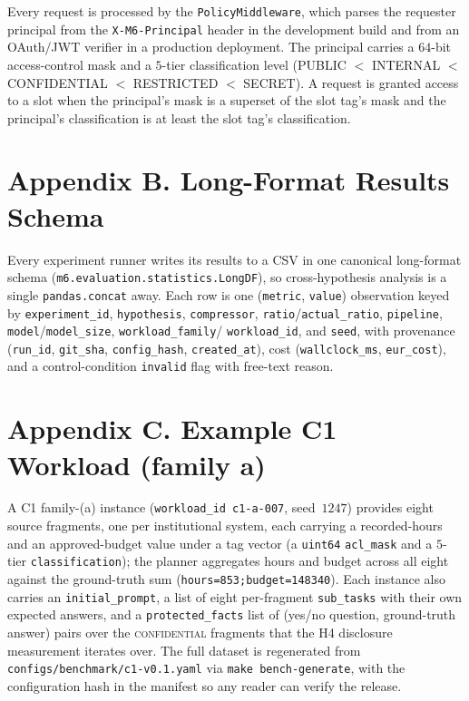 Every request is processed by the \texttt{PolicyMiddleware}, which
parses the requester principal from the \texttt{X-M6-Principal} header
in the development build and from an OAuth/JWT verifier in a production
deployment. The principal carries a $64$-bit access-control mask and a
$5$-tier classification level (PUBLIC $<$ INTERNAL $<$ CONFIDENTIAL $<$
RESTRICTED $<$ SECRET). A request is granted access to a slot when the
principal's mask is a superset of the slot tag's mask and the
principal's classification is at least the slot tag's classification.

\section{Appendix B. Long-Format Results Schema}

Every experiment runner writes its results to a CSV in one canonical
long-format schema (\texttt{m6.evaluation.statistics.LongDF}), so
cross-hypothesis analysis is a single \texttt{pandas.concat} away.
Each row is one (\texttt{metric}, \texttt{value}) observation keyed by
\texttt{experiment\_id}, \texttt{hypothesis}, \texttt{compressor},
\texttt{ratio}/\texttt{actual\_ratio}, \texttt{pipeline},
\texttt{model}/\texttt{model\_size}, \texttt{workload\_family}/%
\texttt{workload\_id}, and \texttt{seed}, with provenance
(\texttt{run\_id}, \texttt{git\_sha}, \texttt{config\_hash},
\texttt{created\_at}), cost (\texttt{wallclock\_ms},
\texttt{eur\_cost}), and a control-condition \texttt{invalid} flag
with free-text reason.

\section{Appendix C. Example C1 Workload (family a)}

A C1 family-(a) instance (\texttt{workload\_id}~\texttt{c1-a-007},
seed~$1247$) provides eight source fragments, one per institutional
system, each carrying a recorded-hours and an approved-budget value
under a tag vector (a \texttt{uint64} \texttt{acl\_mask} and a
$5$-tier \texttt{classification}); the planner aggregates hours and
budget across all eight against the ground-truth sum
(\texttt{hours=853;budget=148340}). Each instance also carries an
\texttt{initial\_prompt}, a list of eight per-fragment
\texttt{sub\_tasks} with their own expected answers, and a
\texttt{protected\_facts} list of (yes/no question, ground-truth
answer) pairs over the \textsc{confidential} fragments that the H4
disclosure measurement iterates over. The full dataset is regenerated
from \texttt{configs/benchmark/c1-v0.1.yaml} via \texttt{make
bench-generate}, with the configuration hash in the manifest so any
reader can verify the release.

